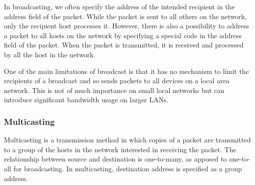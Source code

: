 In broadcasting, we often specify the address of the intended recipient in the address field of the packet. While the packet is sent to all others on the network, only the recipient host processes it. However, there is also a possibility to address a packet to all hosts on the network by specifying a special code in the address field of the packet. When the packet is transmitted, it is received and processed by all the host in the network.\cite{tenanbaum2012networks}

One of the main limitations of broadcast is that it has no mechanism to limit the recipients of a broadcast and so sends packets to all devices on a local area network. This is not of much importance on small local networks but can introduce significant bandwidth usage on larger LANs.



\subsubsection{Multicasting}

Multicasting is a transmission method in which copies of a packet are transmitted to a group of the hosts in the network interested in receiving the packet. The relationship between source and destination is one-to-many, as apposed to one-to-all for broadcasting. In multicasting, destination address is specified as a group address.

